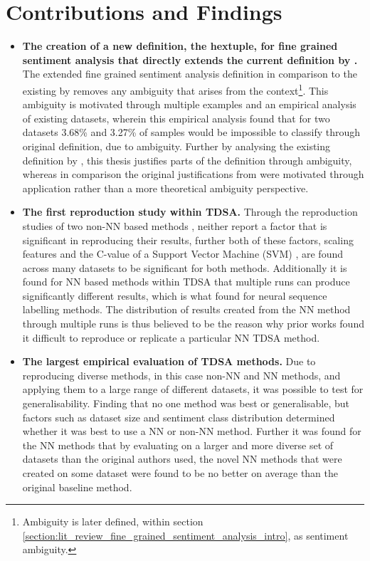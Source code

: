 \section{Contributions and Findings}
\begin{itemize}
    \item \textbf{The creation of a new definition, the hextuple, for fine grained sentiment analysis that directly extends the current definition by \citet{liu2015sentiment}.}\newline
    The extended fine grained sentiment analysis definition in comparison to the existing by \citet{liu2015sentiment} removes any ambiguity that arises from the context\footnote{Ambiguity is later defined, within section \ref{section:lit_review_fine_grained_sentiment_analysis_intro}, as sentiment ambiguity.}. This ambiguity is motivated through multiple examples and an empirical analysis of existing datasets, wherein this empirical analysis found that for two datasets 3.68\% and 3.27\% of samples would be impossible to classify through \citet{liu2015sentiment} original definition, due to ambiguity. Further by analysing the existing definition by \citet{liu2015sentiment}, this thesis justifies parts of the definition through ambiguity, whereas in comparison the original justifications from \citet{liu2015sentiment} were motivated through application rather than a more theoretical ambiguity perspective.  
    \item \textbf{The first reproduction study within TDSA.}\newline
    Through the reproduction studies of two non-NN based methods \citep{vo2015target, wang-etal-2017-tdparse}, neither report a factor that is significant in reproducing their results, further both of these factors, scaling features and the C-value of a Support Vector Machine (SVM) \citep{chang2011libsvm}, are found across many datasets to be significant for both methods. Additionally it is found for NN based methods within TDSA that multiple runs can produce significantly different results, which is what \citet{reimers-gurevych-2017-reporting} found for neural sequence labelling methods. The distribution of results created from the NN method through multiple runs is thus believed to be the reason why prior works found it difficult to reproduce or replicate a particular NN TDSA method.
    \item \textbf{The largest empirical evaluation of TDSA methods.}\newline
    Due to reproducing diverse methods, in this case non-NN and NN methods, and applying them to a large range of different datasets, it was possible to test for generalisability. Finding that no one method was best or generalisable, but factors such as dataset size and sentiment class distribution determined whether it was best to use a NN or non-NN method. Further it was found for the NN methods that by evaluating on a larger and more diverse set of datasets than the original authors used, the novel NN methods that were created on some dataset were found to be no better on average than the original baseline method.

\end{itemize}
